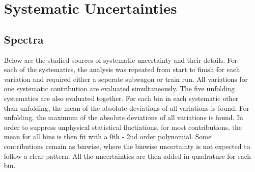 \section{Systematic Uncertainties}
\label{chap:Systematics}

\subsection{Spectra}
\label{sec:SystematicsSpectra}

Below are the studied sources of systematic uncertainty and their details. For each of the systematics, the analysis was repeated from start to finish for each variation and required either a seperate subwagon or train run. All variations for one systematic contribution are evaluated simultaneously. The five unfolding systematics are also evaluated together. For each bin in each systematic other than unfolding, the mean of the absolute deviations of all variations is found. For unfolding, the maximum of the absolute deviations of all variations is found. In order to suppress unphysical statistical fluctiations, for most contributions, the mean for all bins is then fit with a 0th - 2nd order polynomial. Some contributions remain as binwise, where the binwise uncertainty is not expected to follow a clear pattern. All the uncertainties are then added in quadrature for each bin.

